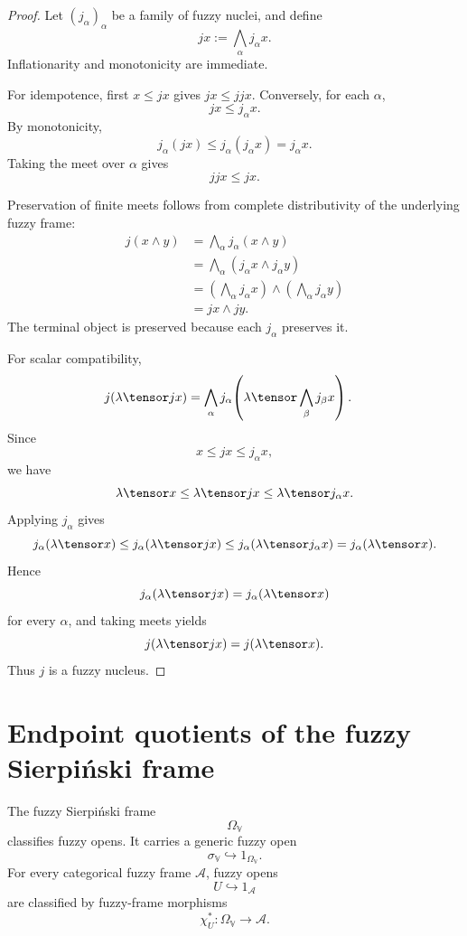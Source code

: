 \begin{proof}
Let \((j_\alpha)_\alpha\) be a family of fuzzy nuclei, and define
\[
    jx:=\bigwedge_\alpha j_\alpha x.
\]
Inflationarity and monotonicity are immediate.

For idempotence, first \(x\leq jx\) gives \(jx\leq jjx\).  Conversely, for each
\(\alpha\),
\[
    jx\leq j_\alpha x.
\]
By monotonicity,
\[
    j_\alpha(jx)\leq j_\alpha(j_\alpha x)=j_\alpha x.
\]
Taking the meet over \(\alpha\) gives
\[
    jjx\leq jx.
\]

Preservation of finite meets follows from complete distributivity of the
underlying fuzzy frame:
\[
\begin{aligned}
    j(x\wedge y)
    &=
    \bigwedge_\alpha j_\alpha(x\wedge y)        \\
    &=
    \bigwedge_\alpha (j_\alpha x\wedge j_\alpha y)\\
    &=
    \left(\bigwedge_\alpha j_\alpha x\right)
    \wedge
    \left(\bigwedge_\alpha j_\alpha y\right)    \\
    &=
    jx\wedge jy.
\end{aligned}
\]
The terminal object is preserved because each \(j_\alpha\) preserves it.

For scalar compatibility,
\[
\begin{aligned}
    j(\lambda\tensor jx)
    &=
    \bigwedge_\alpha
    j_\alpha\!\left(\lambda\tensor\bigwedge_\beta j_\beta x\right).
\end{aligned}
\]
Since
\[
    x\leq jx\leq j_\alpha x,
\]
we have
\[
    \lambda\tensor x
    \leq
    \lambda\tensor jx
    \leq
    \lambda\tensor j_\alpha x.
\]
Applying \(j_\alpha\) gives
\[
    j_\alpha(\lambda\tensor x)
    \leq
    j_\alpha(\lambda\tensor jx)
    \leq
    j_\alpha(\lambda\tensor j_\alpha x)
    =
    j_\alpha(\lambda\tensor x).
\]
Hence
\[
    j_\alpha(\lambda\tensor jx)
    =
    j_\alpha(\lambda\tensor x)
\]
for every \(\alpha\), and taking meets yields
\[
    j(\lambda\tensor jx)=j(\lambda\tensor x).
\]
Thus \(j\) is a fuzzy nucleus.
\end{proof}

\section{Endpoint quotients of the fuzzy Sierpiński frame}
\label{sec:endpoint-quotients-fuzzy-sierpinski}

The fuzzy Sierpiński frame
\[
    \Omega_{\mathbb V}
\]
classifies fuzzy opens.  It carries a generic fuzzy open
\[
    \sigma_{\mathbb V}\hookrightarrow 1_{\Omega_{\mathbb V}}.
\]
For every categorical fuzzy frame \(\mathcal A\), fuzzy opens
\[
    U\hookrightarrow1_{\mathcal A}
\]
are classified by fuzzy-frame morphisms
\[
    \chi_U^\ast:\Omega_{\mathbb V}\to\mathcal A.
\]

